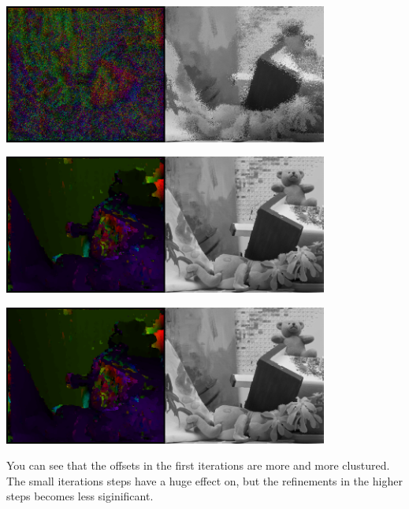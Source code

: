 \documentclass[a4paper]{scrartcl}
\begin{document}
\vspace{1cm}
\begin{minipage}{0.8\textwidth}
  \centering
  \includegraphics[width=0.8\textwidth]{images/flow-it-1.png}
\end{minipage}

\vspace{1cm}
\begin{minipage}{0.8\textwidth}
  \centering
  \includegraphics[width=0.8\textwidth]{images/flow-it-2.png}
\end{minipage}

\vspace{1cm}
\begin{minipage}{0.8\textwidth}
  \centering
  \includegraphics[width=0.8\textwidth]{images/flow-it-3.png}
\end{minipage}

You can see that the offsets in the first iterations are more and more clustured.
The small iterations steps have a huge effect on, but the refinements in the higher
steps becomes less siginificant.
\end{document}
